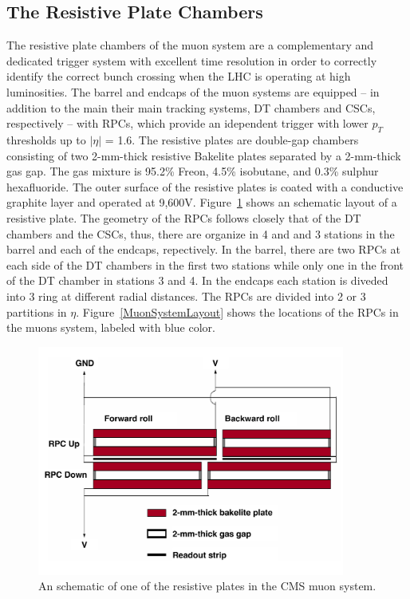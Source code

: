 \subsection{The Resistive Plate Chambers}
The resistive plate chambers of the muon system are a complementary
and dedicated trigger system with excellent time resolution in order
to correctly identify the correct bunch crossing when the LHC is
operating at high luminosities. The barrel and endcaps of the muon
systems are equipped -- in addition to the main their main tracking
systems, DT chambers and CSCs, respectively -- with RPCs, which
provide an idependent trigger with lower $p_{T}$ thresholds up to
$|\eta|$ = 1.6. The resistive plates are double-gap chambers consisting of two
2-mm-thick resistive Bakelite plates separated by a 2-mm-thick gas
gap. The gas mixture is 95.2\% Freon, 4.5\% isobutane, and 0.3\%
sulphur hexafluoride. The outer surface of the resistive plates is
coated with a conductive graphite layer and operated at
9,600\unit{V}. Figure~\ref{fig:rpc} shows an schematic layout of a
resistive plate.
The geometry of the RPCs follows closely that of the DT chambers and
the CSCs, thus, there are organize in 4 and and 3 stations in the
barrel and each of the endcaps, repectively. In the barrel, there are two RPCs at
each side of the DT chambers in the first two stations while only one
in the front of the DT chamber in stations 3 and 4. In the endcaps
each station is diveded into 3 ring at different radial distances. The
RPCs are divided into 2 or 3 partitions in $\eta$. Figure~\ref{MuonSystemLayout} shows
the locations of the RPCs in the muons system, labeled with blue color.
\begin{figure}
 \centering
\includegraphics[width=0.9\textwidth]{CMS_DetectorFigures/RPC.pdf}
\caption{An schematic of one of the resistive plates in the CMS muon system.\label{fig:rpc}}
\end{figure}

